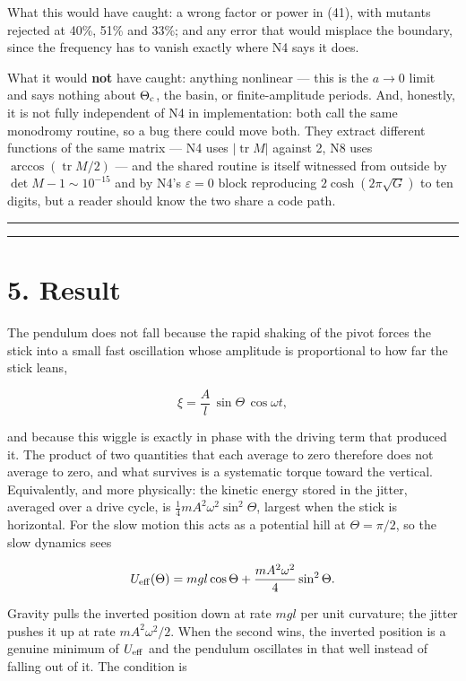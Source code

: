 \documentclass[11pt,a4paper]{article}
\begin{document}
What this would have caught: a wrong factor or power in (41), with mutants
rejected at 40\%, 51\% and 33\%; and any error that would misplace the boundary,
since the frequency has to vanish exactly where N4 says it does.

What it would \textbf{not} have caught: anything nonlinear --- this is the \(a\to0\)
limit and says nothing about \(\Theta_{\rm c}\), the basin, or finite-amplitude
periods. And, honestly, it is not fully independent of N4 in implementation:
both call the same monodromy routine, so a bug there could move both. They
extract different functions of the same matrix --- N4 uses \(|\operatorname{tr}M|\)
against 2, N8 uses \(\arccos(\operatorname{tr}M/2)\) --- and the shared routine is
itself witnessed from outside by \(\det M-1\sim10^{-15}\) and by N4's
\(\varepsilon=0\) block reproducing \(2\cosh(2\pi\sqrt G)\) to ten digits, but a
reader should know the two share a code path.

\begin{center}\rule{0.5\linewidth}{0.5pt}\end{center}

\begin{center}\rule{0.5\linewidth}{0.5pt}\end{center}

\hypertarget{result}{%
\section{5. Result}\label{result}}

The pendulum does not fall because the rapid shaking of the pivot forces the
stick into a small fast oscillation whose amplitude is proportional to how far
the stick leans,

\[
\xi = \frac{A}{l}\,\sin\Theta\,\cos\omega t,
\]

and because this wiggle is exactly in phase with the driving term that produced
it. The product of two quantities that each average to zero therefore does not
average to zero, and what survives is a systematic torque toward the vertical.
Equivalently, and more physically: the kinetic energy stored in the jitter,
averaged over a drive cycle, is \(\tfrac14 mA^2\omega^2\sin^2\Theta\), largest
when the stick is horizontal. For the slow motion this acts as a potential hill
at \(\Theta=\pi/2\), so the slow dynamics sees

\[
U_{\rm eff}(\Theta) = mgl\cos\Theta + \frac{mA^2\omega^2}{4}\sin^2\Theta.
\]

Gravity pulls the inverted position down at rate \(mgl\) per unit curvature; the
jitter pushes it up at rate \(mA^2\omega^2/2\). When the second wins, the inverted
position is a genuine minimum of \(U_{\rm eff}\) and the pendulum oscillates in
that well instead of falling out of it. The condition is
\end{document}
